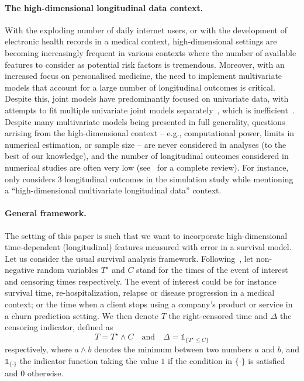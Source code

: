 \documentclass[11pt]{article}
\newcommand{\ind}[1]{\mathds{1}_{#1}}
\begin{document}
\paragraph{The high-dimensional longitudinal data context.}
With the exploding number of daily internet users, or with the development of electronic health records in a medical context, high-dimensional settings are becoming increasingly frequent in various contexts where the number of available features to consider as potential risk factors is tremendous.
Moreover, with an increased focus on personalised medicine, the need to implement multivariate models that account for a large number of longitudinal outcomes is critical. Despite this, joint models have predominantly focused on univariate data, with attempts to fit multiple univariate joint models separately~\citep{wang2012joint}, which is inefficient~\citep{lin2002maximum}. 
Despite many multivariate models being presented in full generality, questions arrising from the high-dimensional context -- e.g., computational power, limits in numerical estimation, or sample size -- are never considered in analyses (to the best of our knowledge), and the number of longitudinal outcomes considered in numerical studies are often very low (see~\citet{hickey2016joint} for a complete review). For instance,~\citet{jaffa2014joint} only considers 3 longitudinal outcomes in the simulation study while mentioning a ``high-dimensional multivariate longitudinal data'' context.


\paragraph{General framework.}

The setting of this paper is such that we want to incorporate high-dimensional time-dependent (longitudinal) features measured with error in a survival model. Let us consider the usual survival analysis framework.
Following~\citet{andersen2012statistical}, let non-negative random variables $T^\star$ and $C$ stand for the times of the event of interest and censoring times respectively. The event of interest could be for instance survival time, re-hospitalization, relapse or disease progression in a medical context; or the time when a client stops using a company's product or service in a churn prediction setting.
We then denote $T$ the right-censored time and $\Delta$ the censoring indicator, defined as 
\begin{equation*}
T = T^\star \wedge C \quad \text{and} \quad \Delta = \ind{\{T^\star \leq C\}}
\end{equation*}
respectively, where $a \wedge b$ denotes the minimum between two numbers $a$ and $b$, and $\ind{\{\cdot\}}$ the indicator function taking the value $1$ if the condition in $\{\cdot\}$ is satisfied and $0$ otherwise.
\end{document}
